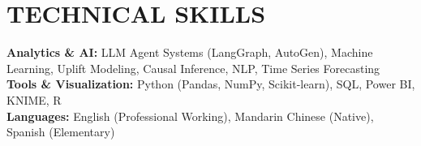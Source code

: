 \documentclass[letterpaper,11pt]{article}
\begin{document}
\section{TECHNICAL SKILLS}

{\small\noindent
\textbf{Analytics \& AI:} LLM Agent Systems (LangGraph, AutoGen), Machine Learning, Uplift Modeling, Causal Inference, NLP, Time Series Forecasting\\[1pt]
\textbf{Tools \& Visualization:} Python (Pandas, NumPy, Scikit-learn), SQL, Power BI, KNIME, R\\[1pt]
\textbf{Languages:} English (Professional Working), Mandarin Chinese (Native), Spanish (Elementary)
}
\end{document}
